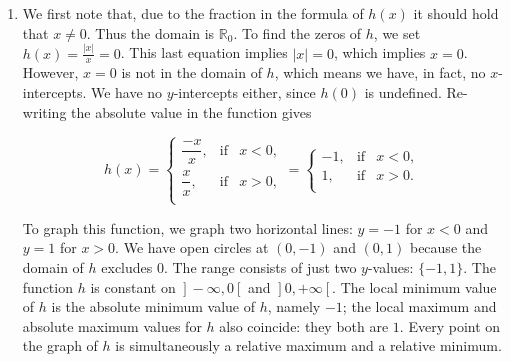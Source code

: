 \begin{example}
\begin{enumerate}
\[ g(x) = |x-3| =  \left\{ \begin{array}{rcl} -(x-3), & \mbox{if} & (x-3) < 0,  \\ (x-3), & \mbox{if} & (x -3) \geq 0. \\ \end{array} \right.\]

Simplifying, we get

\[ g(x) =\left\{ \begin{array}{rcl} -x+3, & \mbox{if} & x<3,  \\ x-3, & \mbox{if} & x \geq 3. \\ \end{array} \right.\]

The resulting graph is shown in Figure~\ref{fig_functions_32}. We determine the domain as $\mathbb{R}$ and the range as $[0,+\infty\left[\right.$.  The function $g$ is increasing on $[3,+\infty\left[\right.$ and decreasing on $\left.\right]-\infty,3]$.  The relative and absolute minimum value of $g$ is $0$ which occurs at $(3,0)$.  As before, there is no relative or absolute maximum value of $g$. Alternatively, we could write $g(x)$ as $f(x-3)$, where $f(x)=|x|$, and proceed with transformations. 
\fi
\ifcourse
\item  We first note that, due to the fraction in the formula of $h(x)$ it should hold that $x \neq 0$.  Thus the domain is $\mathbb{R}_0$.  To find the zeros of $h$, we set $h(x) = \frac{|x|}{x} = 0$.  This last equation implies $|x|=0$, which implies $x=0$.  However, $x=0$ is not in the domain of $h$, which means we have, in fact, no $x$-intercepts.  We have no $y$-intercepts either, since $h(0)$ is undefined.  Re-writing the absolute value in the function gives

\[ h(x) =\left\{ \begin{array}{rcl} \dfrac{-x}{x}, & \mbox{if} & x <0,  \\ [10pt] \dfrac{x}{x}, & \mbox{if} & x > 0, \\ \end{array} \right. = \left\{ \begin{array}{rcl} -1, & \mbox{if} & x < 0, \\ 1, & \mbox{if} & x >0. \\ \end{array} \right. \]

To graph this function, we graph two horizontal lines:  $y = -1$ for $x < 0$ and $y = 1$ for $x > 0$.  We have open circles at $(0,-1)$ and $(0,1)$ because the domain of $h$ excludes 0.   The range consists of just two $y$-values: $\{-1,1\}$.  The function $h$ is constant on $\left.\right]-\infty,0\left[\right.$ and $\left.\right]0,+\infty\left[\right.$.  The local minimum value of $h$ is the absolute minimum value of $h$, namely $-1$;  the local maximum and absolute maximum values for $h$ also coincide: they both are $1$.  Every point on the graph of $h$ is simultaneously a relative maximum and a relative minimum. %
\fi


\end{enumerate}
\end{example}
